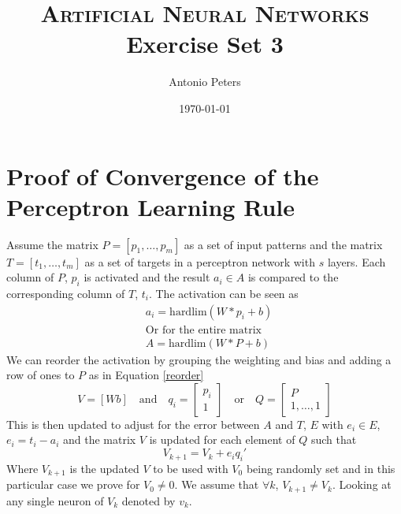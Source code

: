 \documentclass{article}%
\title{	
\textsc{Artificial Neural Networks} \\ [25pt] %
\huge Exercise Set 3 \\ %
}
\author{Antonio Peters} %
\date{\today} %
\begin{document}
\maketitle %
\section{Proof of Convergence of the Perceptron Learning Rule}
Assume the matrix $P = [p_1,\dots,p_m]$ as a set of input patterns and the matrix $T = [t_1,\dots,t_m]$ as a set of targets in a perceptron network with $s$ layers. Each column of $P$, $p_i$ is activated and the result $a_i \in A$ is compared to the corresponding column of $T$, $t_i$. The activation can be seen as
\begin{equation}
\begin{align}
  &a_i = \text{hardlim}(W*p_i + b) \\
  &\text{Or for the entire matrix} \\
  &A = \text{hardlim}(W*P + b)
\end{align}
\end{equation}
We can reorder the activation by grouping the weighting and bias and adding a row of ones to $P$ as in Equation \ref{reorder}
\begin{equation}\label{reorder}
  V = [W b] \quad \text{and} \quad q_i = \begin{bmatrix} p_i \\ 1 \end{bmatrix} \quad \text{or} \quad Q = \begin{bmatrix} P \\ 1,\dots,1 \end{bmatrix}
\end{equation}
This is then updated to adjust for the error between $A$ and $T$, $E$ with $e_i \in E$, $e_i = t_i - a_i$ and the matrix $V$ is updated for each element of $Q$ such that
\begin{equation}
  V_{k+1} = V_k + e_iq_i'
\end{equation}
Where $V_{k+1}$ is the updated $V$ to be used with $V_0$ being randomly set and in this particular case we prove for $V_0 \neq 0$. We assume that $\forall k$, $V_{k+1} \neq V_k$. Looking at any single neuron of $V_k$ denoted by $v_k$. 
\end{document}
